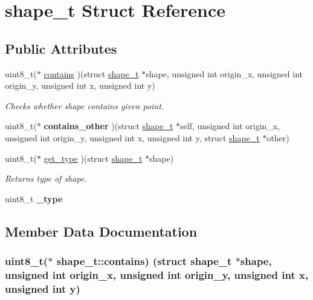 \hypertarget{structshape__t}{}\section{shape\+\_\+t Struct Reference}
\label{structshape__t}
\subsection*{Public Attributes}
\begin{DoxyCompactItemize}
\item 
uint8\+\_\+t($\ast$ \hyperlink{structshape__t_a75ba52eac0f74cc9e0a2fb94d4a8b818}{contains} )(struct \hyperlink{structshape__t}{shape\+\_\+t} $\ast$shape, unsigned int origin\+\_\+x, unsigned int origin\+\_\+y, unsigned int x, unsigned int y)
\begin{DoxyCompactList}\small\item\em Checks whether shape contains given point. \end{DoxyCompactList}\item 
uint8\+\_\+t($\ast$ {\bfseries contains\+\_\+other} )(struct \hyperlink{structshape__t}{shape\+\_\+t} $\ast$self, unsigned int origin\+\_\+x, unsigned int origin\+\_\+y, unsigned int x, unsigned int y, struct \hyperlink{structshape__t}{shape\+\_\+t} $\ast$other)\hypertarget{structshape__t_af4aafb89c1bcbb2c62d386fd1111ad4e}{}\label{structshape__t_af4aafb89c1bcbb2c62d386fd1111ad4e}

\item 
uint8\+\_\+t($\ast$ \hyperlink{structshape__t_afc88b328b0f24d73c23d9b856debcddf}{get\+\_\+type} )(struct \hyperlink{structshape__t}{shape\+\_\+t} $\ast$shape)
\begin{DoxyCompactList}\small\item\em Returns type of shape. \end{DoxyCompactList}\item 
uint8\+\_\+t {\bfseries \+\_\+type}\hypertarget{structshape__t_a24723d0898b20102003633f3d47dcaf1}{}\label{structshape__t_a24723d0898b20102003633f3d47dcaf1}

\end{DoxyCompactItemize}


\subsection{Member Data Documentation}
\subsubsection[{\texorpdfstring{contains}{contains}}]{\setlength{\rightskip}{0pt plus 5cm}uint8\+\_\+t($\ast$ shape\+\_\+t\+::contains) (struct {\bf shape\+\_\+t} $\ast$shape, unsigned int origin\+\_\+x, unsigned int origin\+\_\+y, unsigned int x, unsigned int y)}\hypertarget{structshape__t_a75ba52eac0f74cc9e0a2fb94d4a8b818}{}\label{structshape__t_a75ba52eac0f74cc9e0a2fb94d4a8b818}


